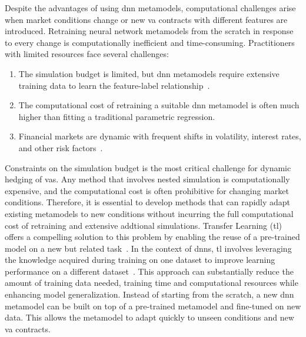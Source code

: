 Despite the advantages of using \gls{dnn} metamodels, computational challenges arise when market conditions change or new \gls{va} contracts with different features are introduced. 
Retraining neural network metamodels from the scratch in response to every change is computationally inefficient and time-consuming.
Practitioners with limited resources face several challenges:
\begin{enumerate}
    \item The simulation budget is limited, but \gls{dnn} metamodels require extensive training data to learn the feature-label relationship~\citep{golestaneh2024many}. 
    \item The computational cost of retraining a suitable \gls{dnn} metamodel is often much higher than fitting a traditional parametric regression.
    \item Financial markets are dynamic with frequent shifts in volatility, interest rates, and other risk factors~\citep{cont2001empirical}.
\end{enumerate}

Constraints on the simulation budget is the most critical challenge for dynamic hedging of \gls{va}s.
Any method that involves nested simulation is computationally expensive, and the computational cost is often prohibitive for changing market conditions.
Therefore, it is essential to develop methods that can rapidly adapt existing metamodels to new conditions without incurring the full computational cost of retraining and extensive addtional simulations.
Transfer Learning (\gls{tl}) offers a compelling solution to this problem by enabling the reuse of a pre-trained model on a new but related task~\citep{pan2009survey}.
In the context of \gls{dnn}s, \gls{tl} involves leveraging the knowledge acquired during training on one dataset to improve learning performance on a different dataset~\citep{yosinski2014transferable}.
This approach can substantially reduce the amount of training data needed, training time and computational resources while enhancing model generalization.
Instead of starting from the scratch, a new \gls{dnn} metamodel can be built on top of a pre-trained metamodel and fine-tuned on new data.
This allows the metamodel to adapt quickly to unseen conditions and new \gls{va} contracts.

